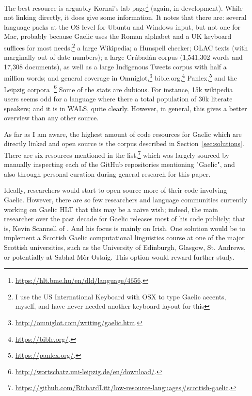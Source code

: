 The best resource is arguably Kornai's lab page\footnote{\href{https://hlt.bme.hu/en/dld/language/4656}{https://hlt.bme.hu/en/dld/language/4656}. } (again, in development). While not linking directly, it does give some information. It notes that there are: several language packs at the OS level for Ubuntu and Windows input, but not one for Mac, probably because Gaelic uses the Roman alphabet and a UK keyboard suffices for most needs;\footnote{I use the US International Keyboard with OSX to type Gaelic accents, myself, and have never needed another keyboard layout for this} a large Wikipedia; a Hunspell checker; OLAC texts (with marginally out of date numbers); a large Cr\'ubad\'an corpus (1,541,302 words and 17,308 documents), as well as a large Indigenous Tweets corpus with half a million words; and general coverage in Omniglot,\footnote{\href{http://omniglot.com/writing/gaelic.htm}{http://omniglot.com/writing/gaelic.htm}. } bible.org,\footnote{\href{https://bible.org/}{https://bible.org/}. } Panlex,\footnote{\href{https://panlex.org/}{https://panlex.org/}. } and the Leipzig corpora \citep{goldhahn2012building}.\footnote{\href{http://wortschatz.uni-leipzig.de/en/download/}{http://wortschatz.uni-leipzig.de/en/download/}. } Some of the stats are dubious. For instance, 15k wikipedia users seems odd for a language where there a total population of 30k literate speakers; and it is in WALS, quite clearly. However, in general, this gives a better overview than any other source.

As far as I am aware, the highest amount of code resources for Gaelic which are directly linked and open source is the corpus described in Section~\ref{sec:solutions}. There are six resources mentioned in the list,\footnote{\href{https://github.com/RichardLitt/low-resource-languages\#scottish-gaelic}{https://github.com/RichardLitt/low-resource-languages\#scottish-gaelic}. } which was largely sourced by manually inspecting each of the GitHub repositories mentioning "Gaelic", and also through personal curation during general research for this paper.

Ideally, researchers would start to open source more of their code involving Gaelic. However, there are so few researchers and language communities currently working on Gaelic HLT that this may be a na\"{i}ve wish; indeed, the main researcher over the past decade for Gaelic releases most of his code publicly; that is, Kevin Scannell of \citet{scannell2007crubadan}. And his focus is mainly on Irish. One solution would be to implement a Scottish Gaelic computational linguistics course at one of the major Scottish universities, such as the University of Edinburgh, Glasgow, St. Andrews, or potentially at Sabhal M\`or Ostaig. This option would reward further study.

